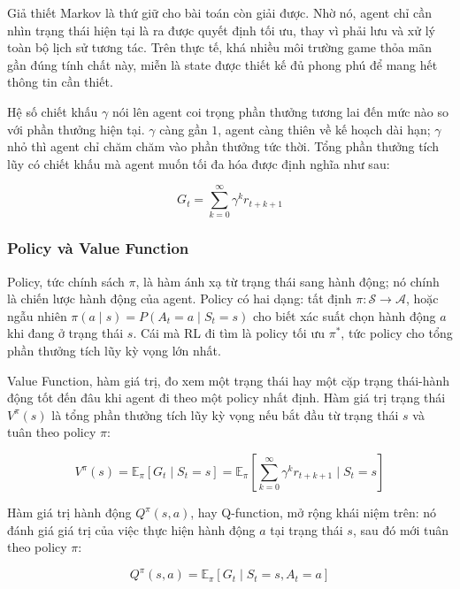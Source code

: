 \indent Giả thiết Markov là thứ giữ cho bài toán còn giải được. Nhờ nó, agent chỉ cần
nhìn trạng thái hiện tại là ra được quyết định tối ưu, thay vì phải lưu và xử lý toàn bộ
lịch sử tương tác. Trên thực tế, khá nhiều môi trường game thỏa mãn gần đúng tính chất
này, miễn là state được thiết kế đủ phong phú để mang hết thông tin cần thiết.

\indent Hệ số chiết khấu $\gamma$ nói lên agent coi trọng phần thưởng tương lai đến mức
nào so với phần thưởng hiện tại. $\gamma$ càng gần $1$, agent càng thiên về kế hoạch dài
hạn; $\gamma$ nhỏ thì agent chỉ chăm chăm vào phần thưởng tức thời. Tổng phần thưởng tích
lũy có chiết khấu mà agent muốn tối đa hóa được định nghĩa như sau:

\begin{equation}
    G_t = \sum_{k=0}^{\infty} \gamma^k r_{t+k+1}
\end{equation}

\subsubsection{Policy và Value Function}

\indent Policy, tức chính sách $\pi$, là hàm ánh xạ từ trạng thái sang hành động; nó
chính là chiến lược hành động của agent. Policy có hai dạng: tất định $\pi: \mathcal{S}
\rightarrow \mathcal{A}$, hoặc ngẫu nhiên $\pi(a \mid s) = P(A_t = a \mid S_t = s)$ cho
biết xác suất chọn hành động $a$ khi đang ở trạng thái $s$. Cái mà RL đi tìm là policy
tối ưu $\pi^*$, tức policy cho tổng phần thưởng tích lũy kỳ vọng lớn nhất.

\indent Value Function, hàm giá trị, đo xem một trạng thái hay một cặp trạng thái-hành
động tốt đến đâu khi agent đi theo một policy nhất định. Hàm giá trị trạng thái $V^\pi(s)$
là tổng phần thưởng tích lũy kỳ vọng nếu bắt đầu từ trạng thái $s$ và tuân theo policy
$\pi$:

\begin{equation}
    V^\pi(s) = \mathbb{E}_\pi \left[ G_t \mid S_t = s \right]
             = \mathbb{E}_\pi \left[ \sum_{k=0}^{\infty} \gamma^k r_{t+k+1}
               \mid S_t = s \right]
\end{equation}

\indent Hàm giá trị hành động $Q^\pi(s, a)$, hay Q-function, mở rộng khái niệm trên: nó
đánh giá giá trị của việc thực hiện hành động $a$ tại trạng thái $s$, sau đó mới tuân
theo policy $\pi$:

\begin{equation}
    Q^\pi(s, a) = \mathbb{E}_\pi \left[ G_t \mid S_t = s, A_t = a \right]
\end{equation}

